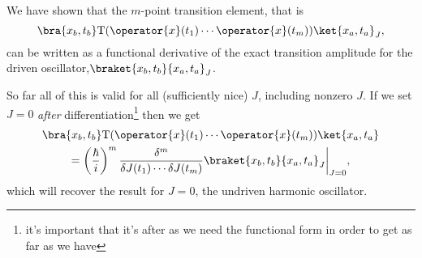 \documentclass[fleqn]{NotesClass}
\newcommand*{\timeorder}{\mathrm{T}}
\begin{document}
    We have shown that the \(m\)-point transition element, that is
    \begin{equation}
        \bra{x_b, t_b} \timeorder(\operator{x}(t_1) \dotsm \operator{x}(t_m)) \ket{x_a, t_a}_J,
    \end{equation}
    can be written as a functional derivative of the exact transition amplitude for the driven oscillator,\(\braket{x_b, t_b}{x_a, t_a}_J\).

    So far all of this is valid for all (sufficiently nice) \(J\), including nonzero \(J\).
    If we set \(J = 0\) \emph{after} differentiation\footnote{it's important that it's after as we need the functional form in order to get as far as we have} then we get
    \begin{multline}
        \bra{x_b, t_b} \timeorder(\operator{x}(t_1) \dotsm \operator{x}(t_m)) \ket{x_a, t_a}\\
        = \left( \frac{\hbar}{i} \right)^m \frac{\delta^m}{\delta J(t_1) \dotsm \delta J(t_m)}\braket{x_b, t_b}{x_a, t_a}_J \bigg\vert_{J = 0},\label{eqn:m-point correlation}
    \end{multline}
    which will recover the result for \(J = 0\), the undriven harmonic oscillator.
    
\end{document}
